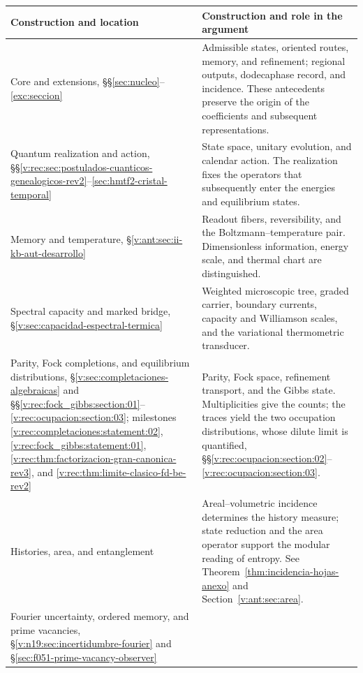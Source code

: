 \begin{table}[H]
\centering
\small
\renewcommand{\arraystretch}{1.2}
\begin{tabularx}{\textwidth}{@{}>{\raggedright\arraybackslash}p{}>{\raggedright\arraybackslash}X@{}}
\toprule
Construction and location & Construction and role in the argument \\
\midrule
Core and extensions, §§\ref{sec:nucleo}--\ref{exc:seccion}
& Admissible states, oriented routes, memory, and refinement; regional
outputs, dodecaphase record, and incidence. These antecedents preserve
the origin of the coefficients and subsequent representations. \\
Quantum realization and action,
§§\ref{v:rec:sec:postulados-cuanticos-genealogicos-rev2}--\ref{sec:hmtf2-cristal-temporal}
& State space, unitary evolution, and calendar action. The realization
fixes the operators that subsequently enter the energies and
equilibrium states. \\
Memory and temperature,
§\ref{v:ant:sec:ii-kb-aut-desarrollo}
& Readout fibers, reversibility, and the Boltzmann--temperature pair.
Dimensionless information, energy scale, and thermal chart are distinguished. \\
Spectral capacity and marked bridge,
§\ref{v:sec:capacidad-espectral-termica}
& Weighted microscopic tree, graded carrier, boundary currents, capacity and
Williamson scales, and the variational thermometric transducer. \\
Parity, Fock completions, and equilibrium distributions,
§\ref{v:sec:completaciones-algebraicas} and
§§\ref{v:rec:fock_gibbs:section:01}--\ref{v:rec:ocupacion:section:03};
milestones \ref{v:rec:completaciones:statement:02},
\ref{v:rec:fock_gibbs:statement:01},
\ref{v:rec:thm:factorizacion-gran-canonica-rev3}, and
\ref{v:rec:thm:limite-clasico-fd-be-rev2}
& Parity, Fock space, refinement transport, and the Gibbs state.
Multiplicities give the counts; the traces yield the two occupation
distributions, whose dilute limit is quantified, §§\ref{v:rec:ocupacion:section:02}--\ref{v:rec:ocupacion:section:03}. \\
Histories, area, and entanglement
& Areal--volumetric incidence determines the history measure;
state reduction and the area operator support the modular reading
of entropy. See Theorem~\ref{thm:incidencia-hojas-anexo}
and Section~\ref{v:ant:sec:area}. \\
Fourier uncertainty, ordered memory, and prime vacancies,
§\ref{v:n19:sec:incertidumbre-fourier} and
§\ref{sec:f051-prime-vacancy-observer}

\end{tabularx}
\end{table}
